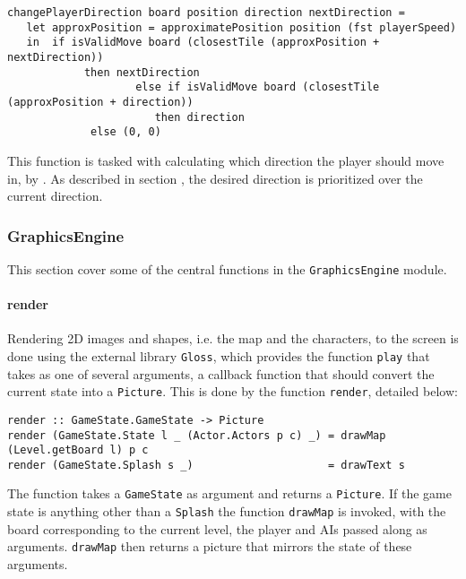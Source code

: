 \documentclass{article}
\begin{document}
\begin{verbatim}
changePlayerDirection board position direction nextDirection =
   let approxPosition = approximatePosition position (fst playerSpeed)
   in  if isValidMove board (closestTile (approxPosition + nextDirection))
	        then nextDirection
					else if isValidMove board (closestTile (approxPosition + direction))
					   then direction
             else (0, 0)

\end{verbatim}
				This function is tasked with calculating which direction the player should move in, by . As described in section , the desired direction is prioritized over the current direction. \\
				\newline


        \subsubsection{GraphicsEngine}
        This section cover some of the central functions in the \texttt{GraphicsEngine} module.
        \paragraph{render}
        Rendering 2D images and shapes, i.e. the map and the characters, to the screen is done using the external library \texttt{Gloss}, which provides the function \texttt{play} that takes as one of several arguments, a callback function that should convert the current state into a \texttt{Picture}. This is done by the function \texttt{render}, detailed below:
        \begin{verbatim}
render :: GameState.GameState -> Picture
render (GameState.State l _ (Actor.Actors p c) _) = drawMap (Level.getBoard l) p c
render (GameState.Splash s _) 					  = drawText s
        \end{verbatim}
The function takes a \texttt{GameState} as argument and returns a \texttt{Picture}. If the game state is anything other than a \texttt{Splash} the function \texttt{drawMap} is invoked, with the board corresponding to the current level,  the player and AIs passed along as arguments. \texttt{drawMap} then returns a picture that mirrors the state of these arguments.
\end{document}
